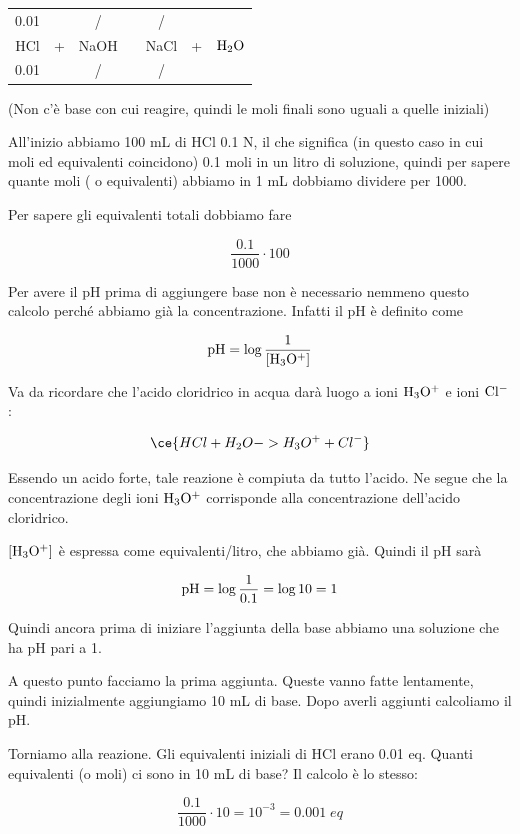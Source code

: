 \begin{center}
    \begin{tabular}{ccccccc}
        0.01 &  & / & & / & &\\
        HCl & + & NaOH & \ce{->} & NaCl & + & $\rm H_2O$\\
        0.01 &  &  / & & / & &\\
    \end{tabular}
\end{center}

(Non c'è base con cui reagire, quindi le moli finali sono uguali a quelle iniziali)

All'inizio abbiamo 100 mL di HCl 0.1 N, il che significa (in questo caso in cui moli ed equivalenti coincidono) 0.1 moli in un litro di soluzione, quindi per sapere quante moli ( o equivalenti) abbiamo in 1 mL dobbiamo dividere per 1000.

Per sapere gli equivalenti totali dobbiamo fare

$$\frac{0.1}{1000} \cdot 100$$

Per avere il pH prima di aggiungere base non è necessario nemmeno questo calcolo perché abbiamo già la concentrazione. Infatti il pH è definito come

$$\rm pH=\log \frac{1}{[H_3O^+]}$$

Va da ricordare che l'acido cloridrico in acqua darà luogo a ioni $\rm H_3O^+$ e ioni $\rm Cl^-$:

$$\ce{HCl + H_2O -> H_3O^+ + Cl^-}$$

Essendo un acido forte, tale reazione è compiuta da tutto l'acido. Ne segue che la concentrazione degli ioni $\rm H_3O^+$ corrisponde alla concentrazione dell'acido cloridrico.

$\rm [H_3O^+]$ è espressa come equivalenti/litro, che abbiamo già. Quindi il pH sarà

$$\rm pH=\log\frac{1}{0.1}=\log10=1$$

Quindi ancora prima di iniziare l'aggiunta della base abbiamo una soluzione che ha pH pari a 1.

A questo punto facciamo la prima aggiunta. Queste vanno fatte lentamente, quindi inizialmente aggiungiamo 10 mL di base. Dopo averli aggiunti calcoliamo il pH.

Torniamo alla reazione. Gli equivalenti iniziali di HCl erano 0.01 eq. Quanti equivalenti (o moli) ci sono in 10 mL di base? Il calcolo è lo stesso:

$$\frac{0.1}{1000} \cdot 10=10^{-3}=0.001 \; eq$$

